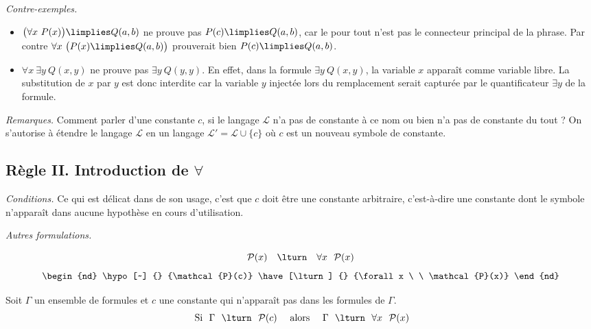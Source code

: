 \documentclass[11pt,class=report,crop=false]{standalone}
\begin{document}
\medskip

\emph{Contre-exemples.} 
\begin{itemize}
	
	\item $\big( \forall x \ P(x) \big) \limplies Q(a,b)$ ne prouve pas  $P(c) \limplies Q(a,b)$,  car le \og{}pour tout\fg{} n'est pas le connecteur principal de la phrase. 
	Par contre $ \forall x \ \big(P(x) \limplies Q(a,b) \big)$ prouverait bien $P(c) \limplies Q(a,b)$.
	
	\item $\forall x \ \exists y \ Q(x,y)$ ne prouve pas $\exists y \ Q(y,y)$.
	En effet, dans la formule \og{}$\exists y \ Q(x,y)$\fg{}, la variable $x$ apparaît comme variable libre. La substitution de $x$ par $y$ est donc interdite car la variable $y$ injectée lors du remplacement serait capturée par le quantificateur $\exists y$ de la formule.
\end{itemize}

\medskip

\emph{Remarques.} Comment parler d'une constante $c$, si le langage $\mathcal{L}$ n'a pas de constante à ce nom ou bien n'a pas de constante du tout ? On s'autorise à étendre le langage $\mathcal{L}$ en un langage $\mathcal{L}' = \mathcal{L} \cup \{ c \}$ où $c$ est un nouveau symbole de constante.


\subsection{Règle II. Introduction de $\forall$}


\medskip

\emph{Conditions.} 
Ce qui est délicat dans de son usage, c'est que $c$ doit être une constante arbitraire, c'est-à-dire une constante dont le symbole n'apparaît dans aucune hypothèse en cours d'utilisation.

	

\emph{Autres formulations.}
	
\[
\mathcal{P}(x) \quad \lturn \quad  \forall x \ \ \mathcal{P}(x)
\]
\[
\begin{nd}
	\hypo [~] {} {\mathcal{P}(c)}
	\have [\lturn] {} {\forall x \ \ \mathcal{P}(x)} 
\end{nd}
\]

Soit $\Gamma$ un ensemble de formules et $c$ une constante qui n'apparaît pas dans les formules de $\Gamma$.
\[
\text{ Si } \ \Gamma \ \ \lturn \ \ \mathcal{P}(c)  \quad 
\text{ alors } \quad \Gamma \ \ \lturn \ \ \forall x \ \ \mathcal{P}(x)
\]
\end{document}
